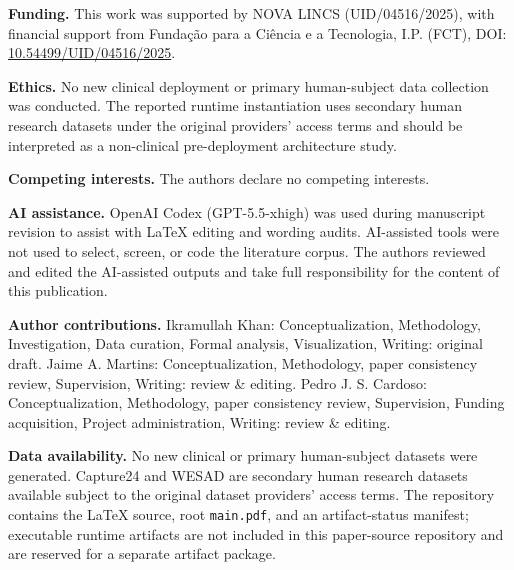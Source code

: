 \documentclass[number,nopreprintline]{elsarticle}
\begin{document}
\noindent\textbf{Funding.} This work was supported by NOVA LINCS (UID/04516/2025), with financial support from Funda\c{c}\~ao para a Ci\^encia e a Tecnologia, I.P. (FCT), DOI: \href{https://doi.org/10.54499/UID/04516/2025}{10.54499/UID/04516/2025}.

\noindent\textbf{Ethics.} No new clinical deployment or primary human-subject data collection was conducted. The reported runtime instantiation uses secondary human research datasets under the original providers' access terms and should be interpreted as a non-clinical pre-deployment architecture study.

\noindent\textbf{Competing interests.} The authors declare no competing interests.

\noindent\textbf{AI assistance.} OpenAI Codex (GPT-5.5-xhigh) was used during manuscript revision to assist with LaTeX editing and wording audits. AI-assisted tools were not used to select, screen, or code the literature corpus. The authors reviewed and edited the AI-assisted outputs and take full responsibility for the content of this publication.

\noindent\textbf{Author contributions.} Ikramullah Khan: Conceptualization, Methodology, Investigation, Data curation, Formal analysis, Visualization, Writing: original draft. Jaime A. Martins: Conceptualization, Methodology, paper consistency review, Supervision, Writing: review \& editing. Pedro J. S. Cardoso: Conceptualization, Methodology, paper consistency review, Supervision, Funding acquisition, Project administration, Writing: review \& editing.

\noindent\textbf{Data availability.} No new clinical or primary human-subject datasets were generated. Capture24 and WESAD are secondary human research datasets available subject to the original dataset providers' access terms. The repository contains the LaTeX source, root \texttt{main.pdf}, and an artifact-status manifest; executable runtime artifacts are not included in this paper-source repository and are reserved for a separate artifact package.
	



\setlength{\bibsep}{1pt}

\end{document}
